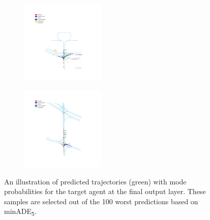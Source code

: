 \begin{figure}
    \centering
    \begin{subfigure}[t]{0.4\linewidth}
        \includegraphics[height=4cm,trim={300 140 260 360},clip]{images_results/4b432f819ef44455882cb2e4d5d375ef_4809652b5d2a4ea29bbe1bbb1bacd43a_minADE5_5.72_2-min.png}
    \end{subfigure}
    \begin{subfigure}[t]{0.4\linewidth}
        \includegraphics[height=4cm,trim={320 160 260 330},clip]{images_results/159dc0dc10134858aed2d6005da00b27_04147507f33e495f912cb64a60bb3f0d_minADE5_5.73_2-min.png}
    \end{subfigure}
    \caption{An illustration of predicted trajectories (green) with mode probabilities for the target agent at the final output layer. These samples are selected out of the 100 worst predictions based on minADE\textsubscript{5}.}
    \label{fig:nuScenes_worst}    
\end{figure}

